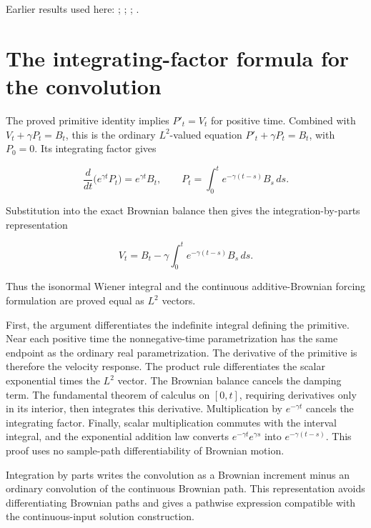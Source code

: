 \documentclass[11pt,a4paper]{article}
\begin{document}
Earlier results used here: \cite[Section~3.6.12]{LangevinLean2026ULASC}; \cite[Section~3.8.2]{LangevinLean2026ULASC}; \cite[Section~3.8.5]{LangevinLean2026ULASC}; \cite[Section~3.8.9]{LangevinLean2026ULASC}.

\section{\texorpdfstring{The integrating-factor formula for the convolution}{The integrating-factor formula for the convolution}}


The proved primitive identity implies \(P'_t=V_t\) for positive time. Combined with \(V_t+\gamma P_t=B_t\), this is the ordinary \(L^{2}\)-valued equation \(P'_t+\gamma P_t=B_t\), with \(P_0=0\). Its integrating factor gives

\[\frac{d}{dt}\bigl(e^{\gamma t}P_t\bigr)=e^{\gamma t}B_t,\qquad P_t=\int_0^t e^{-\gamma(t-s)}B_s\,ds.\]

Substitution into the exact Brownian balance then gives the integration-by-parts representation

\[V_t=B_t-\gamma\int_0^t e^{-\gamma(t-s)}B_s\,ds.\]

Thus the isonormal Wiener integral and the continuous additive-Brownian forcing formulation are proved equal as \(L^{2}\) vectors.



First, the argument differentiates the indefinite integral defining the primitive. Near each positive time the nonnegative-time parametrization has the same endpoint as the ordinary real parametrization. The derivative of the primitive is therefore the velocity response. The product rule differentiates the scalar exponential times the \(L^{2}\) vector. The Brownian balance cancels the damping term. The fundamental theorem of calculus on \([0,t]\), requiring derivatives only in its interior, then integrates this derivative. Multiplication by \(e^{-\gamma t}\) cancels the integrating factor. Finally, scalar multiplication commutes with the interval integral, and the exponential addition law converts \(e^{-\gamma t}e^{\gamma s}\) into \(e^{-\gamma(t-s)}\). This proof uses no sample-path differentiability of Brownian motion.



Integration by parts writes the convolution as a Brownian increment minus an ordinary convolution of the continuous Brownian path. This representation avoids differentiating Brownian paths and gives a pathwise expression compatible with the continuous-input solution construction.
\end{document}
